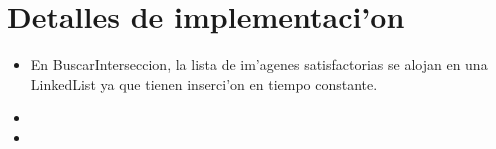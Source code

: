 \section{Detalles de implementaci'on}
\begin{itemize}
\item En BuscarInterseccion, la lista de im'agenes satisfactorias se alojan en una LinkedList ya que tienen inserci'on en tiempo constante.
\item 
\item 

\end{itemize}
